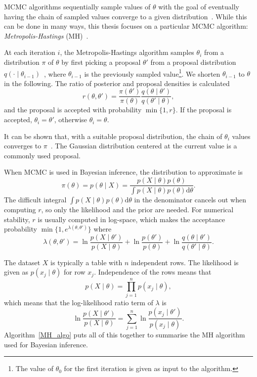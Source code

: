 \documentclass[english,twoside,openright]{HYgraduMLDS}
\newcommand{\dx}{\mathrm{d}}
\begin{document}
MCMC algorithms sequentially sample values of \(\theta\)
with the goal of eventually having the chain of sampled values converge to 
a given distribution~\cite{BDA}. While this can be done in many ways, this thesis 
focuses on a particular MCMC algorithm:
\emph{Metropolis-Hastings} (MH)~\cite{MRR53, Has70}.

At each iteration \(i\), the Metropolis-Hastings algorithm samples \(\theta_i\) 
from a distribution \(\pi\) of \(\theta\)
by first picking a proposal \(\theta'\) from a proposal 
distribution \(q(\cdot \mid \theta_{i-1})\)~\cite{MRR53}, where \(\theta_{i-1}\) is the
previously sampled value\footnote{
    The value of \(\theta_0\) for the first iteration is given as input to the 
    algorithm.
}. We shorten \(\theta_{i-1}\) to \(\theta\) in the following. 
The ratio of posterior and proposal densities is calculated
\[
    r(\theta, \theta') = \frac{\pi(\theta')}{\pi(\theta)}
    \frac{q(\theta\mid \theta')}{q(\theta'\mid \theta)},
\]
and the proposal is accepted with probability \(\min\{1, r\}\). 
If the proposal is accepted, 
\(\theta_i = \theta'\), otherwise \(\theta_i = \theta\).

It can be shown that, with a suitable proposal distribution, the chain of 
\(\theta_i\) values converges to \(\pi\)~\cite{Has70}. The Gaussian distribution centered
at the current value is a commonly used proposal.

When MCMC is used in Bayesian inference, the distribution to approximate is 
\[
    \pi(\theta) = p(\theta \mid X) = \frac{p(X \mid \theta)p(\theta)}
    {\int p(X\mid \theta)p(\theta)\dx\theta}.
\]
The difficult integral \(\int p(X\mid \theta)p(\theta)\dx\theta\) in the denominator
cancels out when computing \(r\), so only the likelihood and the prior are needed. 
For numerical stability, \(r\) is usually computed in 
log-space, which makes the acceptance probability
\(\min\{1, e^{\lambda(\theta, \theta')}\}\) where 
\begin{equation}\label{lambda_equation}
    \lambda(\theta, \theta') = \ln \frac{p(X\mid \theta')}{p(X\mid \theta)}
    + \ln \frac{p(\theta')}{p(\theta)}
    + \ln \frac{q(\theta\mid \theta')}{q(\theta'\mid \theta)}.
\end{equation}

The dataset \(X\) is typically a table with \(n\) independent rows.
The likelihood is given as \(p(x_j\mid \theta)\)
for row \(x_j\). Independence of the rows means that 
\[
    p(X\mid \theta) = \prod_{j=1}^n p(x_j\mid \theta),
\]
which means that the log-likelihood ratio term of \(\lambda\) is
\[
    \ln \frac{p(X\mid \theta')}{p(X\mid \theta)}
    = \sum_{j=1}^n \ln\frac{p(x_j\mid \theta')}{p(x_j\mid \theta)}.
\]
Algorithm~\ref{MH_algo} puts all of this together to summarise the MH 
algorithm used for Bayesian inference.
\end{document}
